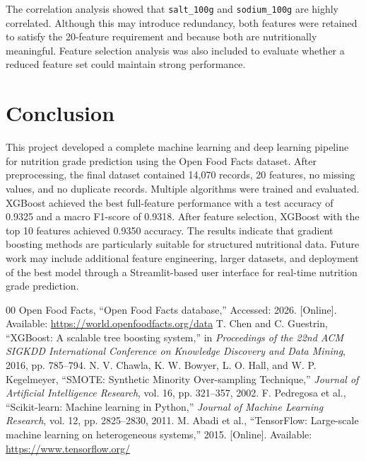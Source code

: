 \documentclass[conference]{IEEEtran}
\begin{document}
The correlation analysis showed that \texttt{salt\_100g} and \texttt{sodium\_100g} are highly correlated. Although this may introduce redundancy, both features were retained to satisfy the 20-feature requirement and because both are nutritionally meaningful. Feature selection analysis was also included to evaluate whether a reduced feature set could maintain strong performance.

\section{Conclusion}
This project developed a complete machine learning and deep learning pipeline for nutrition grade prediction using the Open Food Facts dataset. After preprocessing, the final dataset contained 14,070 records, 20 features, no missing values, and no duplicate records. Multiple algorithms were trained and evaluated. XGBoost achieved the best full-feature performance with a test accuracy of 0.9325 and a macro F1-score of 0.9318. After feature selection, XGBoost with the top 10 features achieved 0.9350 accuracy. The results indicate that gradient boosting methods are particularly suitable for structured nutritional data. Future work may include additional feature engineering, larger datasets, and deployment of the best model through a Streamlit-based user interface for real-time nutrition grade prediction.

\begin{thebibliography}{00}
 Open Food Facts, ``Open Food Facts database,'' Accessed: 2026. [Online]. Available: \url{https://world.openfoodfacts.org/data}
 T. Chen and C. Guestrin, ``XGBoost: A scalable tree boosting system,'' in \textit{Proceedings of the 22nd ACM SIGKDD International Conference on Knowledge Discovery and Data Mining}, 2016, pp. 785--794.
 N. V. Chawla, K. W. Bowyer, L. O. Hall, and W. P. Kegelmeyer, ``SMOTE: Synthetic Minority Over-sampling Technique,'' \textit{Journal of Artificial Intelligence Research}, vol. 16, pp. 321--357, 2002.
 F. Pedregosa et al., ``Scikit-learn: Machine learning in Python,'' \textit{Journal of Machine Learning Research}, vol. 12, pp. 2825--2830, 2011.
 M. Abadi et al., ``TensorFlow: Large-scale machine learning on heterogeneous systems,'' 2015. [Online]. Available: \url{https://www.tensorflow.org/}
\end{thebibliography}
\end{document}
